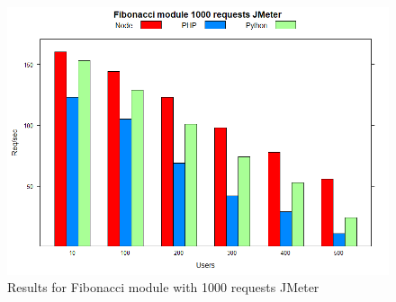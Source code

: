 \documentclass[../thesis.tex]{subfiles}
\begin{document}
\begin{figure}[H]
	\centering
	\includegraphics[width=1\textwidth]{../images/1000requestsFiboJMeter.png}
	\caption{Results for Fibonacci module with 1000 requests JMeter}
	\label{rys1}
\end{figure}
\end{document}
